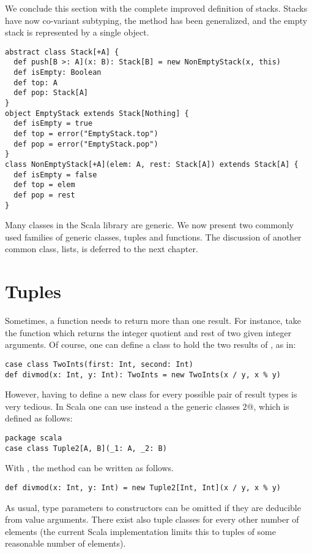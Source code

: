 We conclude this section with the complete improved definition of
stacks. Stacks have now co-variant subtyping, the  method
has been generalized, and the empty stack is represented by a single
object.
\begin{lstlisting}
abstract class Stack[+A] {
  def push[B >: A](x: B): Stack[B] = new NonEmptyStack(x, this)
  def isEmpty: Boolean
  def top: A
  def pop: Stack[A]
}
object EmptyStack extends Stack[Nothing] {
  def isEmpty = true
  def top = error("EmptyStack.top")
  def pop = error("EmptyStack.pop")
}
class NonEmptyStack[+A](elem: A, rest: Stack[A]) extends Stack[A] {
  def isEmpty = false
  def top = elem
  def pop = rest
}
\end{lstlisting}
Many classes in the Scala library are generic. We now present two
commonly used families of generic classes, tuples and functions. The
discussion of another common class, lists, is deferred to the next
chapter.

\section{Tuples}

Sometimes, a function needs to return more than one result. For
instance, take the function  which returns the integer quotient
and rest of two given integer arguments.  Of course, one can define a
class to hold the two results of , as in:
\begin{lstlisting}
case class TwoInts(first: Int, second: Int)
def divmod(x: Int, y: Int): TwoInts = new TwoInts(x / y, x % y)
\end{lstlisting}
However, having to define a new class for every possible pair of
result types is very tedious. In Scala one can use instead a
the generic classes \lstinline@Tuple$2$@, which is defined as follows:
\begin{lstlisting}
package scala
case class Tuple2[A, B](_1: A, _2: B)
\end{lstlisting}
With , the  method can be written as follows.
\begin{lstlisting}
def divmod(x: Int, y: Int) = new Tuple2[Int, Int](x / y, x % y)
\end{lstlisting}
As usual, type parameters to constructors can be omitted if they are
deducible from value arguments. There exist also tuple classes for
every other number of elements (the current Scala implementation
limits this to tuples of some reasonable number of elements).  

